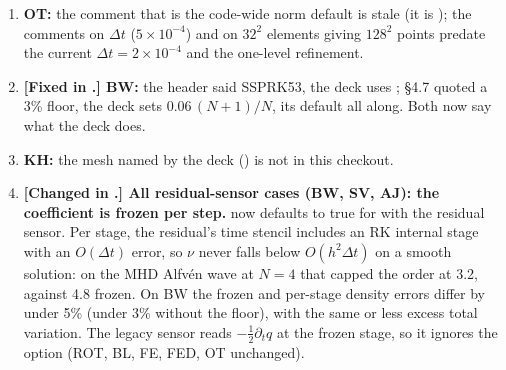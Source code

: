 \documentclass[10pt]{article}
\begin{document}
\begin{enumerate}[leftmargin=*]
set  as the conservative limiter does. Now it does (1 limiter call per step
against 5 without , measured on the installed OrdinaryDiffEqLowStorageRK 1.11.0; through Jexpresso's , which has
, old and new decks give byte-identical output at $t=1,2\,\tau_0$).
\item \textbf{OT:} the comment that  is the code-wide norm default is stale (it is ); the
comments on $\Delta t$ ($5\times10^{-4}$) and on $32^2$ elements giving $128^2$ points predate the current
$\Delta t=2\times10^{-4}$ and the one-level refinement.
\item \textbf{[Fixed in .] BW:} the header said SSPRK53, the deck uses ;
 \S4.7 quoted a 3\% floor, the deck sets $0.06\,(N+1)/N$, its default all along. Both now say what the deck does.
\item \textbf{KH:} the mesh named by the deck () is not in
this checkout.
\item \textbf{[Changed in .] All residual-sensor cases (BW, SV, AJ): the coefficient is frozen per step.}
 now defaults to true for  with the residual sensor. Per stage, the residual's
time stencil includes an RK internal stage with an $O(\Delta t)$ error, so $\nu$ never falls below $O(h^2\Delta t)$ on a
smooth solution: on the MHD Alfv\'en wave at $N=4$ that capped the order at 3.2, against 4.8 frozen. On BW the
frozen and per-stage density errors differ by under 5\% (under 3\% without the floor), with the same or less
excess total variation. The legacy sensor reads $-\tfrac12\partial_t q$ at the frozen stage, so it ignores the
option (ROT, BL, FE, FED, OT unchanged).
\end{enumerate}


\end{document}
